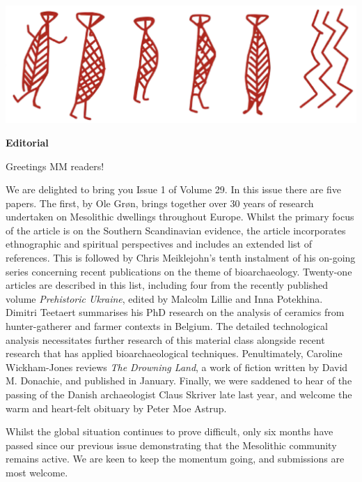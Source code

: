 \documentclass[12pt,a4paper]{article}
\begin{document}
 \begin{center}\includegraphics[width=1\linewidth]{MM_Head} \end{center}

 \begin{center}
 \Large\textbf{Editorial}
 \end{center}

 \noindent Greetings MM readers! \vspace{5mm}

 \noindent We are delighted to bring you Issue 1 of Volume 29. In this
 issue there are five papers. The first, by Ole Grøn, brings together
 over 30 years of research undertaken on Mesolithic dwellings throughout
 Europe. Whilst the primary focus of the article is on the Southern
 Scandinavian evidence, the article incorporates ethnographic and
 spiritual perspectives and includes an extended list of references.
 This is followed by Chris Meiklejohn's tenth instalment of his on-going
 series concerning recent publications on the theme of bioarchaeology.
 Twenty-one articles are described in this list, including four from the
 recently published volume \emph{Prehistoric Ukraine}, edited by Malcolm
 Lillie and Inna Potekhina. Dimitri Teetaert summarises his PhD research
 on the analysis of ceramics from hunter-gatherer and farmer contexts in
 Belgium. The detailed technological analysis necessitates further
 research of this material class alongside recent research that has
 applied bioarchaeological techniques. Penultimately, Caroline
 Wickham-Jones reviews \emph{The Drowning Land}, a work of fiction
 written by David M. Donachie, and published in January. Finally, we
 were saddened to hear of the passing of the Danish archaeologist Claus
 Skriver late last year, and welcome the warm and heart-felt obituary by
 Peter Moe Astrup.

 \vspace{5mm}

 \noindent Whilst the global situation continues to prove difficult,
 only six months have passed since our previous issue demonstrating that
 the Mesolithic community remains active. We are keen to keep the
 momentum going, and submissions are most welcome.
\end{document}
